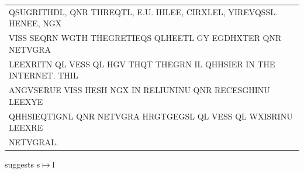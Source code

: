 \documentclass[aspectratio=169, lualatex, 10pt,dvipsnames,svgnames]{beamer} %
\def\enbleu#1{\textcolor{bleu}{#1}}
\begin{document}
\begin{frame}
{\begin{tabular}[t]{l}
      QSUG\enbleu{R}\enbleu{I}\enbleu{T}\enbleu{H}DL, Q\enbleu{N}R \enbleu{T}\enbleu{H}\enbleu{R}\enbleu{E}Q\enbleu{T}L, \enbleu{E}.U. \enbleu{I}HL\enbleu{E}E, C\enbleu{I}\enbleu{R}XL\enbleu{E}L, Y\enbleu{I}\enbleu{R}\enbleu{E}VQSSL. \enbleu{H}\enbleu{E}\enbleu{N}E\enbleu{E}, NGX \\
      V\enbleu{I}SS S\enbleu{E}Q\enbleu{R}\enbleu{N} WG\enbleu{T}\enbleu{H} \enbleu{T}\enbleu{H}\enbleu{E}G\enbleu{R}\enbleu{E}\enbleu{T}\enbleu{I}EQS QLH\enbleu{E}E\enbleu{T}L GY EGDHX\enbleu{T}\enbleu{E}\enbleu{R} Q\enbleu{N}R \enbleu{N}\enbleu{E}\enbleu{T}VG\enbleu{R}A \\
      L\enbleu{E}EX\enbleu{R}\enbleu{I}\enbleu{T}N QL V\enbleu{E}SS QL \enbleu{H}GV \enbleu{T}\enbleu{H}Q\enbleu{T} \enbleu{T}\enbleu{H}\enbleu{E}G\enbleu{R}N \enbleu{I}L QHHS\enbleu{I}\enbleu{E}R \enbleu{I}\enbleu{N} \enbleu{T}\enbleu{H}\enbleu{E} \enbleu{I}\enbleu{N}\enbleu{T}\enbleu{E}\enbleu{R}\enbleu{N}\enbleu{E}\enbleu{T}. \enbleu{T}\enbleu{H}\enbleu{I}L \\
      A\enbleu{N}GVS\enbleu{E}RU\enbleu{E} V\enbleu{I}SS \enbleu{H}\enbleu{E}SH NGX \enbleu{I}\enbleu{N} R\enbleu{E}L\enbleu{I}U\enbleu{N}\enbleu{I}\enbleu{N}U Q\enbleu{N}R R\enbleu{E}C\enbleu{E}SGH\enbleu{I}\enbleu{N}U L\enbleu{E}EXY\enbleu{E} \\
      QHHS\enbleu{I}EQ\enbleu{T}\enbleu{I}G\enbleu{N}L Q\enbleu{N}R \enbleu{N}\enbleu{E}\enbleu{T}VG\enbleu{R}A H\enbleu{R}G\enbleu{T}GEGSL QL V\enbleu{E}SS QL WX\enbleu{I}SR\enbleu{I}\enbleu{N}U L\enbleu{E}EX\enbleu{R}\enbleu{E} \\
      \enbleu{N}\enbleu{E}\enbleu{T}VG\enbleu{R}AL.
    \end{tabular}
  }
  \vspace{0.5cm}

  \normalsize
  \color{black}{The first word is THIL}
  \pause
  
  {suggests s$\mapsto$l}
  \color{black}
\end{frame}
\end{document}
